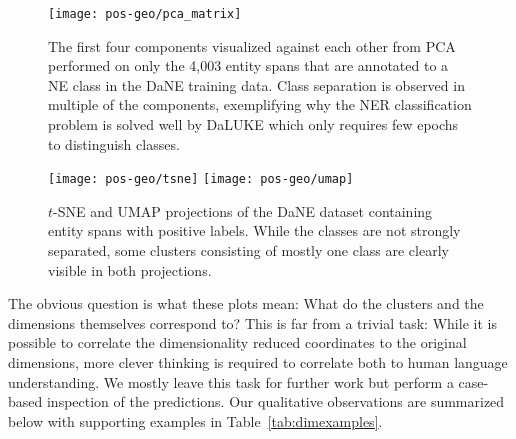 \documentclass[main.tex]{subfiles}
\begin{document}
\begin{figure}[H]
    \centering
    \texttt{[image: pos-geo/pca\_matrix]}
    \caption{
        The first four components visualized against each other from PCA performed on only the 4,003 entity spans that are annotated to a NE class in the DaNE training data.
        Class separation is observed in multiple of the components, exemplifying why the NER classification problem is solved well by DaLUKE which only requires few epochs to distinguish classes.
    }
    \label{fig:pos-pca}
\end{figure}\noindent

\begin{figure}[H]
    \centering
        \texttt{[image: pos-geo/tsne]}
        \texttt{[image: pos-geo/umap]}
    \caption{
        $t$-SNE and UMAP projections of the DaNE dataset containing entity spans with positive labels.
        While the classes are not strongly separated, some clusters consisting of mostly one class are clearly visible in both projections.
    }
    \label{fig:pos-tsne}
\end{figure}\noindent
The obvious question is what these plots mean: What do the clusters and the dimensions themselves correspond to?
This is far from a trivial task: While it is possible to correlate the dimensionality reduced coordinates to the original dimensions, more clever thinking is required to correlate both to human language understanding.
We mostly leave this task for further work but perform a case-based inspection of the predictions.
Our qualitative observations are summarized below with supporting examples in Table~\ref{tab:dimexamples}.
\end{document}
